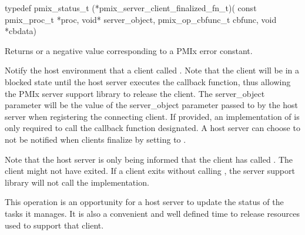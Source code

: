 \format

\cspecificstart
\begin{codepar}
typedef pmix_status_t (*pmix_server_client_finalized_fn_t)(
                             const pmix_proc_t *proc,
                             void* server_object,
                             pmix_op_cbfunc_t cbfunc,
                             void *cbdata)
\end{codepar}
\cspecificend

\begin{arglist}
\end{arglist}

Returns  or a negative value corresponding to a \ac{PMIx} error constant.

\descr

Notify the host environment that a client called .
Note that the client will be in a blocked state until the host server executes the callback function, thus allowing the PMIx server support library to release the client.
The server_object parameter will be the value of the server_object parameter passed to
 by the host server when registering the connecting client.  If provided, an implementation of 
is only required to
call the callback function designated.  A host server can choose to not be notified when clients finalize by setting  to .

Note that the host server is only being informed that the client has called .  The client might not have exited.  If a client
exits without calling , the server support library will not call the  implementation.

\advicermstart
This operation is an opportunity for a host server
to update the status of the tasks it manages.  It is also a convenient and well defined time to release resources used to support that client.
\advicermend


\subsection{}

